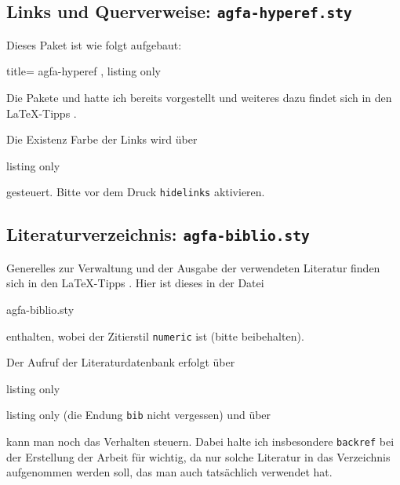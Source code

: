 \subsection{Links und Querverweise: \texttt{agfa-hyperef.sty}}\label{subsec:agfa-hyperef}
Dieses Paket ist wie folgt aufgebaut:
%
\begin{tcblisting}{title= agfa-hyperef , listing only}
\RequirePackage{varioref}	
\RequirePackage[breaklinks = true]{hyperref}   
\RequirePackage{cleveref}
\end{tcblisting}
%
Die Pakete  und  hatte ich bereits vorgestellt und weiteres dazu findet sich in den  \LaTeX{}-Tipps \cite{latextipps2}.

Die Existenz \bzw Farbe der Links wird über
%
\begin{tcblisting}{listing only}
\hypersetup{
	,colorlinks	= true    	%
	,urlcolor	= blue      	%
	,citecolor	= blue      	%
	,linkcolor	= blue		%
	}
\end{tcblisting}
%
gesteuert.
Bitte vor dem Druck \texttt{hidelinks} aktivieren.
%
\subsection{Literaturverzeichnis: \texttt{agfa-biblio.sty}}\label{subsec:agfa-biblio}
%
Generelles zur Verwaltung und der Ausgabe der verwendeten Literatur finden sich in den \LaTeX-Tipps \cite{latextipps6}.
Hier ist dieses in der Datei
%
\begin{tcolorbox}
agfa-biblio.sty
\end{tcolorbox}
%
enthalten, wobei der Zitierstil \texttt{numeric} ist (bitte beibehalten).%

Der Aufruf der Literaturdatenbank erfolgt über
%
\begin{tcblisting}{listing only}
	
\end{tcblisting}{listing only}
%
(die Endung \texttt{bib} nicht vergessen) und über
%
\begin{tcblisting}{listing only}
\ExecuteBibliographyOptions}{%
	,backref		= true		%
 	,url		= true		%
 	,doi		= false		%
	,eprint		= false		%
	}	
\end{tcblisting}
%	
kann man noch das Verhalten steuern.
Dabei halte ich insbesondere \texttt{backref} bei der Erstellung der Arbeit für wichtig, da nur solche Literatur in das Verzeichnis aufgenommen werden soll, das man auch tatsächlich verwendet hat.

